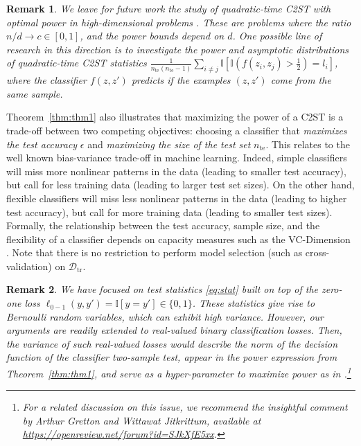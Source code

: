 \documentclass[a4paper]{article}
\newtheorem{remark}{Remark}
\begin{document}
  \begin{remark}
  We leave for future work the study of quadratic-time C2ST with optimal power
  in high-dimensional problems \citep{Ramdas15}. These are problems where the
  ratio $n/d \to c \in [0,1]$, and the power bounds
  depend on $d$. One possible line of research in this direction is to
  investigate the power and asymptotic distributions of quadratic-time
  C2ST statistics $
  \frac{1}{n_\text{te}(n_\text{te}-1)}\sum_{i\neq j} \mathbb{I}[
  \mathbb{I}(f(z_i,z_j)>\frac{1}{2}) = l_i]$, where the classifier $f(z,z')$ 
  predicts if the examples $(z,z')$ come from the same
  sample.
  \end{remark}

  Theorem~\ref{thm:thm1} also illustrates that maximizing the power of a
  C2ST is a trade-off between two competing objectives:
  choosing a classifier that \emph{maximizes the test accuracy} $\epsilon$ and
  \emph{maximizing the size of the test set} $n_{\text{te}}$. This relates 
  to the well known bias-variance trade-off in machine learning.
  Indeed, simple classifiers will miss more nonlinear patterns in the
  data (leading to smaller test accuracy), but call for less training data
  (leading to larger test set sizes).
  On the other hand, flexible classifiers will miss less nonlinear patterns in
  the data (leading to higher test accuracy), but call for more training data
  (leading to smaller test sizes). Formally, the relationship between the test
  accuracy, sample size, and the flexibility of a classifier depends on  
  capacity measures such as the VC-Dimension
  \citep{vapnik98}. Note that there is no restriction to perform model
  selection (such as cross-validation) on $\mathcal{D}_\text{tr}$.

  \begin{remark}\label{remark:loss}
  We have focused on test statistics \eqref{eq:stat} built on top of the
  zero-one loss $\ell_{0-1}(y,y') = \mathbb{I}[y=y'] \in \{0,1\}$. These
  statistics give rise to Bernoulli random variables, which can exhibit high
  variance. However, our arguments are readily extended to real-valued binary
  classification losses. Then, the variance of such real-valued losses would
  describe the norm of the decision function of the classifier two-sample test,
  appear in the power expression from Theorem~\ref{thm:thm1}, and serve as a
  hyper-parameter to maximize power as in \citep[Section
  3]{gretton2012optimal}.\footnote{For a related discussion on this issue, we
  recommend the insightful comment by Arthur Gretton and Wittawat Jitkrittum,
  available at \url{https://openreview.net/forum?id=SJkXfE5xx}.}
  \end{remark}
\end{document}
